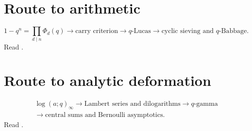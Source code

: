 \documentclass[11pt,oneside,openany]{book}
\theoremstyle{definition}
\theoremstyle{remark}
\begin{document}
\section*{Route to arithmetic}
\[
 1-q^n=\prod_{d\mid n}\Phi_d(q)
 \longrightarrow \text{carry criterion}
 \longrightarrow q\text{-Lucas}
 \longrightarrow \text{cyclic sieving and }q\text{-Babbage}.
\]
Read .

\section*{Route to analytic deformation}
\[
\begin{gathered}
 \log(a;q)_\infty
 \longrightarrow \text{Lambert series and dilogarithms}
 \longrightarrow q\text{-gamma}\\
 \longrightarrow \text{central sums and Bernoulli asymptotics}.
\end{gathered}
\]
Read .

\backmatter
\end{document}
